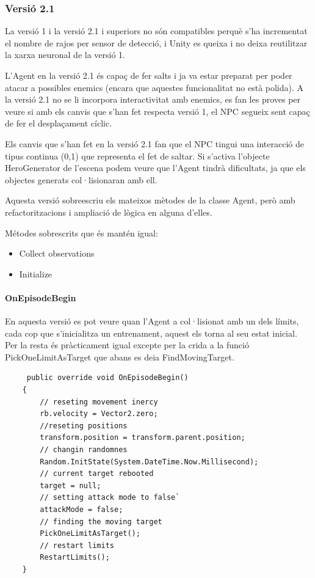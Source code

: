 \documentclass{article}
\begin{document}
    \newpage
    
    \subsubsection{Versió 2.1}
    
       La versió 1 i la versió 2.1 i superiors no són compatibles perquè s'ha incrementat el nombre de rajos per sensor de detecció, i Unity es queixa i no deixa reutilitzar la xarxa neuronal de la versió 1.

    L'Agent en la versió 2.1 és capaç de fer salts i ja va estar preparat per poder atacar a possibles enemics (encara que aquestes funcionalitat no està polida). A la versió 2.1 no se li incorpora interactivitat amb enemics, es fan les proves per veure si amb els canvis que s'han fet respecta versió 1, el NPC segueix sent capaç de fer el desplaçament cíclic.
    
    Els canvis que s'han fet en la versió 2.1 fan que el NPC tingui una interacció de tipus continua (0,1) que representa el fet de saltar.
    Si s'activa l'objecte HeroGenerator de l'escena podem veure que l'Agent tindrà dificultats, ja que els objectes generats col·lisionaran amb ell.
    
    Aquesta versió sobreescriu els mateixos mètodes de la classe Agent, però amb refactoritzacions i ampliació de lògica en alguna d'elles.
    
    Métodes sobrescrits que és mantén igual:
    \begin{itemize}
    \item Collect observations
    \item Initialize
    \end{itemize}
    
    \paragraph{OnEpisodeBegin}
    En aquesta versió es pot veure quan l'Agent a col·lisionat amb un dels límits, cada cop que s'inicialitza un entrenament, aquest els torna al seu estat inicial. Per la resta és pràcticament igual excepte per la crida a la funció PickOneLimitAsTarget que abans es deia FindMovingTarget.
    
    \begin{lstlisting}
     public override void OnEpisodeBegin()
    {
        // reseting movement inercy
        rb.velocity = Vector2.zero;
        //reseting positions
        transform.position = transform.parent.position;
        // changin randomnes
        Random.InitState(System.DateTime.Now.Millisecond);
        // current target rebooted
        target = null;
        // setting attack mode to false`
        attackMode = false;
        // finding the moving target
        PickOneLimitAsTarget();
        // restart limits
        RestartLimits();
    }
    \end{lstlisting}
    
\end{document}
